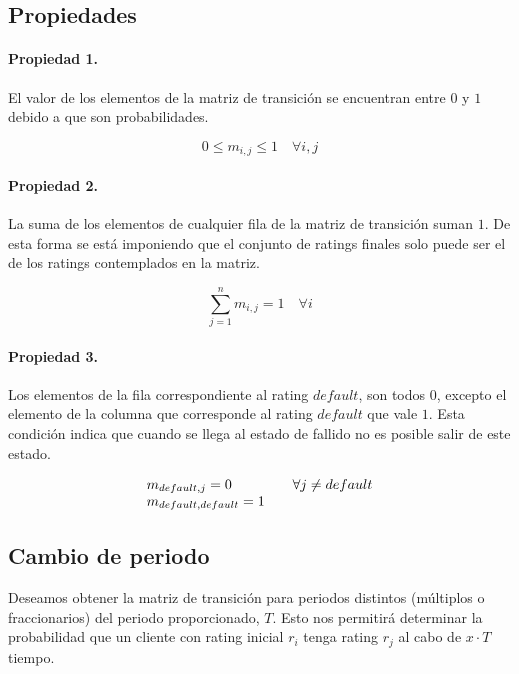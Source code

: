 \subsection{Propiedades}

\paragraph{Propiedad 1.}
El valor de los elementos de la matriz de transici\'on se encuentran entre $0$ 
y $1$ debido a que son probabilidades.

\begin{displaymath}
0 \leq m_{i,j} \leq 1 \quad \forall i,j
\end{displaymath}

\paragraph{Propiedad 2.}
La suma de los elementos de cualquier fila de la matriz de transici\'on suman $1$.
De esta forma se  est\'a imponiendo que el conjunto de ratings finales solo puede 
ser el de los ratings contemplados en la matriz.

\begin{displaymath}
\sum_{j=1}^{n} m_{i,j} = 1 \quad \forall i
\end{displaymath}

\paragraph{Propiedad 3.}
Los elementos de la fila correspondiente al rating $default$, son todos $0$,
excepto el elemento de la columna que corresponde al rating $default$ que vale 
$1$. Esta condici\'on indica que cuando se llega al estado de fallido no es 
posible salir de este estado.

\begin{displaymath}
\begin{array}{ll}
m_{default,j} = 0        & \quad \forall j \neq default \cr
m_{default,default} = 1
\end{array}
\end{displaymath}


\subsection{Cambio de periodo}

Deseamos obtener la matriz de transici\'on para periodos distintos (m\'ultiplos o 
fraccionarios) del periodo proporcionado, $T$. Esto nos permitir\'a determinar la 
probabilidad que un cliente con rating inicial $r_i$ tenga rating $r_j$ al cabo 
de $x \cdot T$ tiempo.

